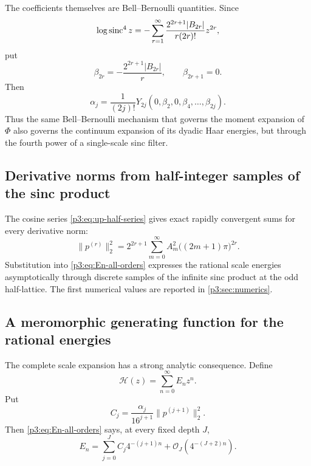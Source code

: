 \documentclass[11pt]{article}
\theoremstyle{definition}
\theoremstyle{remark}
\newcommand{\bigO}{\mathcal O}
\begin{document}
The coefficients themselves are Bell--Bernoulli quantities.  Since
\begin{equation}\label{p3:eq:log-sinc4}
 \log\operatorname{sinc}^4z
 =-\sum_{r=1}^\infty
 \frac{2^{2r+1}|B_{2r}|}{r(2r)!}z^{2r},
\end{equation}
put
\begin{equation}\label{p3:eq:beta-sinc4}
 \beta_{2r}=-\frac{2^{2r+1}|B_{2r}|}{r},
 \qquad \beta_{2r+1}=0.
\end{equation}
Then
\begin{equation}\label{p3:eq:alpha-Bell}
 \alpha_j=\frac1{(2j)!}
 Y_{2j}(0,\beta_2,0,\beta_4,\ldots,\beta_{2j}).
\end{equation}
Thus the same Bell--Bernoulli mechanism that governs the moment expansion of
$\Phi$ also governs the continuum expansion of its dyadic Haar energies, but
through the fourth power of a single-scale sinc filter.

\subsection{Derivative norms from half-integer samples of the sinc product}

The cosine series \eqref{p3:eq:up-half-series} gives exact rapidly convergent sums
for every derivative norm:
\begin{equation}\label{p3:eq:p-derivative-norm-samples}
 \|p^{(r)}\|_2^2
 =2^{2r+1}\sum_{m=0}^\infty
 A_m^2\bigl((2m+1)\pi\bigr)^{2r}.
\end{equation}
Substitution into \eqref{p3:eq:En-all-orders} expresses the rational scale energies
asymptotically through discrete samples of the infinite sinc product at the odd
half-lattice.  The first numerical values are reported in
\cref{p3:sec:numerics}.


\subsection{A meromorphic generating function for the rational energies}

The complete scale expansion has a strong analytic consequence.  Define
\begin{equation}\label{p3:eq:H-energy-generating}
 \mathcal H(z)=\sum_{n=0}^\infty E_nz^n.
\end{equation}
Put
\begin{equation}\label{p3:eq:Cj-energy}
 C_j=\frac{\alpha_j}{16^{j+1}}\|p^{(j+1)}\|_2^2.
\end{equation}
Then \eqref{p3:eq:En-all-orders} says, at every fixed depth $J$,
\begin{equation}\label{p3:eq:En-geometric-expansion}
 E_n=\sum_{j=0}^{J}C_j4^{-(j+1)n}
      +\bigO_J\!\left(4^{-(J+2)n}\right).
\end{equation}
\end{document}
